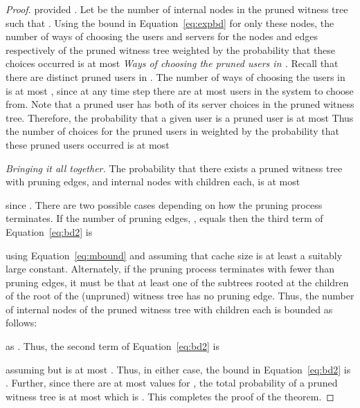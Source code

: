 \documentclass[conference]{IEEEtran}
\begin{document}
\begin{proof}
provided .
Let  be the number of internal nodes  in the pruned witness tree
such that . Using the bound in Equation~\ref{eq:expbd}
for only these  nodes, the number of ways of choosing the users
and servers for the nodes and edges respectively of the pruned witness tree
weighted by the probability that these choices occurred is at most 
{\em Ways of choosing the pruned users in .} Recall that there are  distinct pruned users  in . The number of ways of choosing the users in  is at
most , since at any time step there are at most  users in the system to choose from. Note that a pruned user has both of its
server choices in the pruned witness tree. Therefore, the probability that a given user is a pruned user is at most  Thus the number of choices for the
 pruned users in  weighted by the probability
that these pruned users occurred is at most

{\em Bringing it all together.} The probability that
there exists a pruned
witness tree with  pruning edges, and  internal nodes with  children each, is at most

since .
There are two possible cases depending on how the pruning process terminates. If the number of pruning edges, , equals  then the third term of Equation~\ref{eq:bd2} is 

using Equation~\ref{eq:mbound} and assuming that cache size  is at least  a suitably large constant.
Alternately, if the pruning process terminates with fewer than  pruning edges, it must be that at least one of the  subtrees rooted at the children of the root  of the 
(unpruned) witness tree has no pruning edge. Thus, the number of internal nodes  of the pruned witness tree with  children  each is bounded as follows:
 
as . Thus, the second term of Equation~\ref{eq:bd2} is 
 
assuming   but is at most .
Thus, in either case, the bound in
Equation~\ref{eq:bd2} is . Further, since there
are at most
 values for , the total probability of a pruned
witness tree is at most
 which is
. This completes the proof of the theorem. 
\end{proof}
\end{document}
